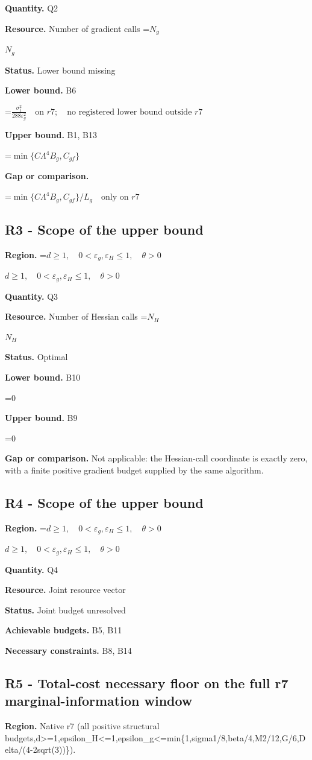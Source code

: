 \documentclass[10pt,a4paper]{article}
\newcommand{\AtlasMath}[1]{\par\begingroup\centering\setbox0=\hbox{$\displaystyle #1$}\ifdim\wd0>1.4\linewidth\typeout{ATLAS WIDE FORMULA: \the\wd0}\fi\ifdim\wd0>\linewidth\resizebox{\linewidth}{!}{\box0}\else\box0\fi\par\endgroup}
\newcommand{\AtlasInlineMath}[1]{\begingroup\setbox0=\hbox{$#1$}\ifdim\wd0>.4\linewidth\endgroup\AtlasMath{#1}\else\endgroup$#1$\fi}
\begin{document}
\textbf{Quantity.} Q2

\textbf{Resource.} Number of gradient calls \AtlasInlineMath{N_g}

\textbf{Status.} Lower bound missing

\textbf{Lower bound.} B6

\AtlasMath{\frac{\sigma_1^2}{288\varepsilon_g^2}\quad\text{on }r7;\quad\text{no registered lower bound outside }r7}
\textbf{Upper bound.} B1, B13

\AtlasMath{\min\{C\Lambda^4B_g,C_{gf}\}}
\textbf{Gap or comparison.}

\AtlasMath{\min\{C\Lambda^4B_g,C_{gf}\}/L_g\quad\text{only on }r7}
\subsection{R3 - Scope of the upper bound}
\textbf{Region.} \AtlasInlineMath{d\ge1,\quad0<\varepsilon_g,\varepsilon_H\le1,\quad\theta>0}

\textbf{Quantity.} Q3

\textbf{Resource.} Number of Hessian calls \AtlasInlineMath{N_H}

\textbf{Status.} Optimal

\textbf{Lower bound.} B10

\AtlasMath{0}
\textbf{Upper bound.} B9

\AtlasMath{0}
\textbf{Gap or comparison.} Not applicable: the Hessian-call coordinate is exactly zero, with a finite positive gradient budget supplied by the same algorithm.

\subsection{R4 - Scope of the upper bound}
\textbf{Region.} \AtlasInlineMath{d\ge1,\quad0<\varepsilon_g,\varepsilon_H\le1,\quad\theta>0}

\textbf{Quantity.} Q4

\textbf{Resource.} Joint resource vector

\textbf{Status.} Joint budget unresolved

\textbf{Achievable budgets.} B5, B11

\textbf{Necessary constraints.} B8, B14

\subsection{R5 - Total-cost necessary floor on the full r7 marginal-information window}
\textbf{Region.} Native r7 (all positive structural budgets,d>=1,epsilon\_\allowbreak{}H<=1,epsilon\_\allowbreak{}g<=min\{1,sigma1/8,beta/4,M2/12,G/6,Delta/(4-2sqrt(3))\}).
\end{document}
